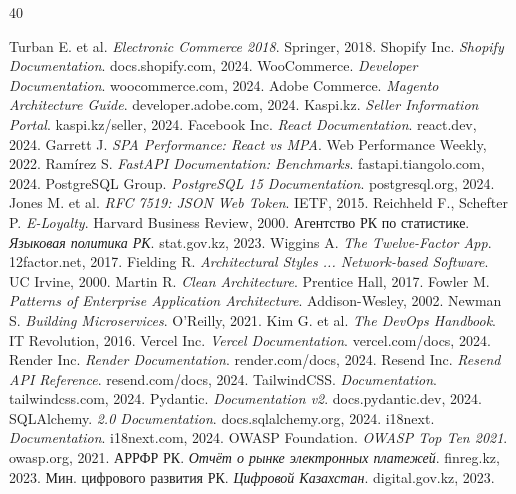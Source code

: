 \documentclass[14pt,a4paper]{extreport}
\begin{document}
\begin{thebibliography}{40}

 Turban E. et al. \textit{Electronic Commerce 2018}. Springer, 2018.
 Shopify Inc. \textit{Shopify Documentation}. docs.shopify.com, 2024.
 WooCommerce. \textit{Developer Documentation}. woocommerce.com, 2024.
 Adobe Commerce. \textit{Magento Architecture Guide}. developer.adobe.com, 2024.
 Kaspi.kz. \textit{Seller Information Portal}. kaspi.kz/seller, 2024.
 Facebook Inc. \textit{React Documentation}. react.dev, 2024.
 Garrett J. \textit{SPA Performance: React vs MPA}. Web Performance Weekly, 2022.
 Ramírez S. \textit{FastAPI Documentation: Benchmarks}. fastapi.tiangolo.com, 2024.
 PostgreSQL Group. \textit{PostgreSQL 15 Documentation}. postgresql.org, 2024.
 Jones M. et al. \textit{RFC 7519: JSON Web Token}. IETF, 2015.
 Reichheld F., Schefter P. \textit{E-Loyalty}. Harvard Business Review, 2000.
 Агентство РК по статистике. \textit{Языковая политика РК}. stat.gov.kz, 2023.
 Wiggins A. \textit{The Twelve-Factor App}. 12factor.net, 2017.
 Fielding R. \textit{Architectural Styles ... Network-based Software}. UC Irvine, 2000.
 Martin R. \textit{Clean Architecture}. Prentice Hall, 2017.
 Fowler M. \textit{Patterns of Enterprise Application Architecture}. Addison-Wesley, 2002.
 Newman S. \textit{Building Microservices}. O'Reilly, 2021.
 Kim G. et al. \textit{The DevOps Handbook}. IT Revolution, 2016.
 Vercel Inc. \textit{Vercel Documentation}. vercel.com/docs, 2024.
 Render Inc. \textit{Render Documentation}. render.com/docs, 2024.
 Resend Inc. \textit{Resend API Reference}. resend.com/docs, 2024.
 TailwindCSS. \textit{Documentation}. tailwindcss.com, 2024.
 Pydantic. \textit{Documentation v2}. docs.pydantic.dev, 2024.
 SQLAlchemy. \textit{2.0 Documentation}. docs.sqlalchemy.org, 2024.
 i18next. \textit{Documentation}. i18next.com, 2024.
 OWASP Foundation. \textit{OWASP Top Ten 2021}. owasp.org, 2021.
 АРРФР РК. \textit{Отчёт о рынке электронных платежей}. finreg.kz, 2023.
 Мин. цифрового развития РК. \textit{Цифровой Казахстан}. digital.gov.kz, 2023.

\end{thebibliography}
\end{document}
